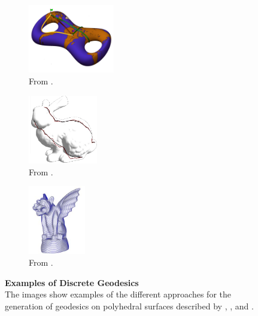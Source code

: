 \documentclass{stdlocal}
\begin{document}
\begin{figure}[b]
  \centering
  \begin{subfigure}[t]{0.30\linewidth}
    \centering
    \includegraphics[height=3cm]{images/polthier2006-1.png}
    \caption{\scriptsize From \textcite{polthier2006}.}
    \label{fig:polthier2006}
  \end{subfigure}
  \begin{subfigure}[t]{0.38\linewidth}
    \centering
    \includegraphics[height=3cm]{images/martinez2005-1.png}
    \caption{\scriptsize From \textcite{martinez2005}.}
    \label{fig:martinez2005}
  \end{subfigure}
  \begin{subfigure}[t]{0.30\linewidth}
    \centering
    \includegraphics[height=3cm]{images/surazhsky2005-1.png}
    \caption{\scriptsize From \textcite{surazhsky2005}.}
    \label{fig:surazhsky2005}
  \end{subfigure}
  \caption[Examples of Discrete Geodesics]{%
    \textbf{Examples of Discrete Geodesics}\\
    The images show examples of the different approaches for the generation of geodesics on polyhedral surfaces described by \textcite{polthier2006}, \textcite{martinez2005}, and \textcite{surazhsky2005}.
  }
  \label{fig:related-work-geodesics}
\end{figure}
\end{document}
